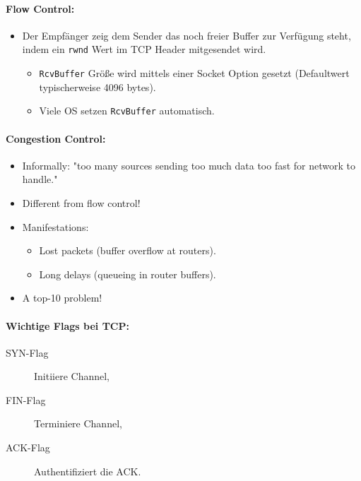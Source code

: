 \documentclass{scrartcl}
\begin{document}
    \paragraph{Flow Control:}
    \label{protocols:TCP_flow_control}
    \begin{itemize}
        \item Der Empfänger zeig dem Sender das noch freier Buffer zur Verfügung steht, 
        indem ein \texttt{rwnd} Wert im TCP Header mitgesendet wird.
        \begin{itemize}
            \item \texttt{RcvBuffer} Größe wird mittels einer Socket Option gesetzt (Defaultwert typischerweise 4096 bytes).
            \item Viele OS setzen \texttt{RcvBuffer} automatisch.
        \end{itemize}
    \end{itemize}


    \paragraph{Congestion Control:}
    \label{protocols:TCP_congestion_control}
    \begin{itemize}
        \item Informally: "too many sources sending too much data too fast for network to handle."
        \item Different from flow control!
        \item Manifestations:
        \begin{itemize}
            \item Lost packets (buffer overflow at routers).
            \item Long delays (queueing in router buffers).
        \end{itemize}
        \item A top-10 problem!
    \end{itemize}
    
    \paragraph{Wichtige Flags bei TCP:}
    
    \begin{description}
        \item [SYN-Flag] Initiiere Channel,
        \item [FIN-Flag] Terminiere Channel,
        \item [ACK-Flag] Authentifiziert die ACK.
    \end{description}
    
\end{document}
